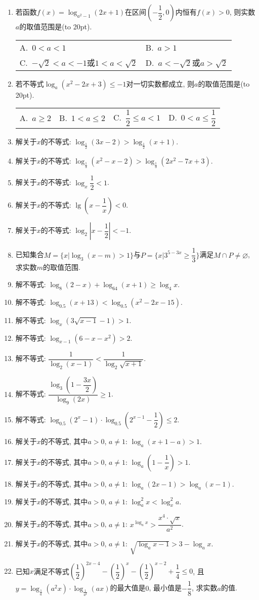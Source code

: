 \documentclass[10pt,a4paper]{article}
\newcommand{\bracket}[1]{(\hbox to #1pt{})}
\newcommand{\twoch}[4]{\par\begin{tabular}{p{.46\textwidth}p{.46\textwidth}}
A.~#1& B.~#2\\
C.~#3& D.~#4
\end{tabular}}
\newcommand{\fourch}[4]{\par\begin{tabular}{p{.23\textwidth}p{.23\textwidth}p{.23\textwidth}p{.23\textwidth}}
A.~#1 &B.~#2& C.~#3& D.~#4
\end{tabular}}
\begin{document}
\begin{enumerate}[1.]
\twoch{$\{x|0<x<\dfrac 45\}$}{$\{x|x>\dfrac 45\}$}{$\{x|\dfrac 45<x<1\}$}{$\{x|0<x<\dfrac 45\}\cup \{x|x>1\}$}
\item 若函数$f(x)=\log_{a^2-1}(2x+1)$在区间$(-\dfrac 12,0)$内恒有$f(x)>0$, 则实数$a$的取值范围是\bracket{20}.
\twoch{$0<a<1$}{$a>1$}{$-\sqrt 2<a<-1$或$1<a<\sqrt 2$}{$a<-\sqrt 2$或$a>\sqrt 2$}
\item 若不等式$\log_a(x^2-2x+3)\le -1$对一切实数都成立, 则$a$的取值范围是\bracket{20}.
\fourch{$a\ge 2$}{$1<a\le 2$}{$\dfrac 12\le a<1$}{$0<a\le \dfrac 12$}
\item 解关于$x$的不等式: $\log_{\frac 12}(3x-2)>\log_{\frac 12}(x+1)$.
\item 解关于$x$的不等式: $\log_{\frac 13}(x^2-x-2)>\log_{\frac 13}(2x^2-7x+3)$.
\item 解关于$x$的不等式: $\log_x\dfrac 12<1$.
\item 解关于$x$的不等式: $\lg (x-\dfrac 1x)<0$.
\item 解关于$x$的不等式: $\log_2|x-\dfrac 12|<-1$.
\item 已知集合$M=\{x|\log_3(x-m)>1\}$与$P=\{x|3^{5-3x} \ge \dfrac 13\}$满足$M\cap P\ne \varnothing$, 求实数$m$的取值范围.
\item 解不等式: $\log_8(2-x)+\log_{64}(x+1)\ge \log_4x$.
\item 解不等式: $\log_{0.5}(x+13)<\log_{0.5}(x^2-2x-15)$.
\item 解不等式: $\log_x(3\sqrt{x-1}-1)>1$.
\item 解不等式: $\log_{x-1}(6-x-x^2)>2$.
\item 解不等式: $\dfrac 1{\log_2(x-1)}<\dfrac 1{\log_2\sqrt{x+1}}$.
\item 解不等式: $\dfrac{\log_3(1-\dfrac{3x}2)}{\log_9(2x)}\ge 1$.
\item 解不等式: $\log_{0.5}({2^x}-1)\cdot \log_{0.5}({2^{x-1}}-\dfrac 12)\le 2$.
\item 解关于$x$的不等式, 其中$a>0$, $a\ne 1$: $\log_a(x+1-a)>1$.
\item 解关于$x$的不等式, 其中$a>0$, $a\ne 1$: $\log_a(1-\dfrac 1x)>1$.
\item 解关于$x$的不等式, 其中$a>0$, $a\ne 1$: $\log_a(2x-1)>\log_a(x-1)$.
\item 解关于$x$的不等式, 其中$a>0$, $a\ne 1$: $\log_a^2x<\log_x^2a$.
\item 解关于$x$的不等式, 其中$a>0$, $a\ne 1$: ${x^{\log_ax}}>\dfrac{x^4\cdot \sqrt x}{a^2}$.
\item 解关于$x$的不等式, 其中$a>0$, $a\ne 1$: $\sqrt{\log_ax-1}>3-\log_ax$.
\item 已知$x$满足不等式$(\dfrac 12)^{2x-4}-(\dfrac 12)^x-(\dfrac 12)^{x-2}+\dfrac 14\le 0$, 且$y=\log_{\frac 1a}(a^2x)\cdot \log_{\frac 1{a^2}}(ax)$的最大值是$0$, 最小值是$-\dfrac 18$, 求实数$a$的值.

\end{enumerate}
\end{document}
